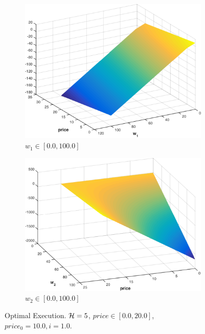 \begin{figure}[t!]
    \centering
    \begin{subfigure}[b]{0.4\textwidth}    
        \includegraphics[width=\linewidth, height=0.8\linewidth]{images/opt_execution_w1}
        \caption{$ w_1 \in \left[ 0.0, 100.0 \right]$}
        \label{fig:opt_execution_w1}
        \vspace{1em}
    \end{subfigure}
    
    \begin{subfigure}[b]{0.4\textwidth}    
        \includegraphics[width=\linewidth, height=0.8\linewidth]{images/opt_execution_w2}
        \caption{$ w_2 \in \left[ 0.0, 100.0 \right]$}
        \label{fig:pt_execution_w2}
    \end{subfigure}  
    \caption{Optimal Execution. $ \mathcal{H} = 5 $, $ price \in \left[ 0.0, 20.0 \right]$, $ price_0 = 10.0, i = 1.0$.}
    \label{fig:pt_execution}
\end{figure}

